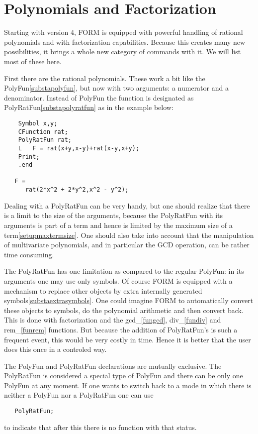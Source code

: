 
\chapter{Polynomials and Factorization}
\label{polynomials}

\noindent Starting with version 4, FORM is equipped with powerful handling 
of rational polynomials and with factorization capabilities. Because this 
creates many new possibilities, it brings a whole new category of commands 
with it. We will list most of these here.

\noindent First there are the rational polynomials. These work a bit like 
the PolyFun\ref{substapolyfun}, but now with two arguments: a numerator and 
a denominator. Instead of PolyFun the function is designated as 
PolyRatFun\ref{substapolyratfun} as in the example below:
\begin{verbatim}
    Symbol x,y;
    CFunction rat;
    PolyRatFun rat;
    L   F = rat(x+y,x-y)+rat(x-y,x+y);
    Print;
    .end

   F =
      rat(2*x^2 + 2*y^2,x^2 - y^2);
\end{verbatim}
Dealing with a PolyRatFun can be very handy, but one should realize that 
there is a limit to the size of the arguments, because the PolyRatFun with 
its arguments is part of a term and hence is limited by the maximum size of 
a term\ref{setupmaxtermsize}. One should also take into account that the 
manipulation of multivariate polynomials, and in particular the GCD 
operation, can be rather time consuming.

\noindent The PolyRatFun has one limitation as compared to the regular 
PolyFun: in its arguments one may use only symbols. Of course FORM is 
equipped with a mechanism to replace other objects by extra internally 
generated symbols\ref{substaextrasymbols}. One could imagine FORM to 
automatically convert these objects to symbols, do the polynomial 
arithmetic and then convert back. This is done with factorization and the 
gcd\_\ref{fungcd}, 
div\_\ref{fundiv} 
and rem\_\ref{funrem} functions. But 
because the addition of PolyRatFun's is such a frequent event, this would 
be very costly in time. Hence it is better that the user does this once 
in a controled way.

\noindent The PolyFun and PolyRatFun declarations are mutually exclusive. 
The PolyRatFun is considered a special type of PolyFun and there can be 
only one PolyFun at any moment. If one wants to switch back to a mode in 
which there is neither a PolyFun nor a PolyRatFun one can use
\begin{verbatim}
   PolyRatFun;
\end{verbatim}
to indicate that after this there is no function with that status.

